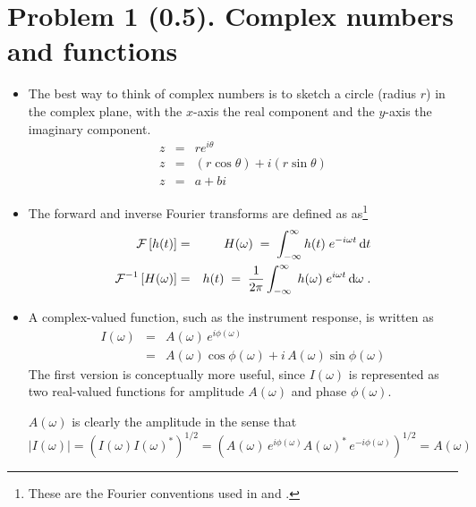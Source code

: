 \documentclass[11pt,titlepage,fleqn]{article}
\newcommand{\fft}{h}
\newcommand{\ffw}{H}
\begin{document}

\pagebreak
\section*{Problem 1 (0.5). Complex numbers and functions}

\begin{itemize}
\item The best way to think of complex numbers is to sketch a circle (radius $r$) in the complex plane, with the $x$-axis the real component and the $y$-axis the imaginary component.
%
\begin{eqnarray*}
z &=& r e^{i\theta}
\\
z &=& (r\cos\theta) + i(r\sin\theta)
\\
z &=& a + bi
\end{eqnarray*}



\item The forward and inverse Fourier transforms are defined as as\footnote{These are the Fourier conventions used in \citet[][p.~109]{DT} and \citet[][Section 6.4.2]{SteinWysession}.}
%
\begin{eqnarray}
\cF \left[ \fft(t) \right] &=& \ffw(\omega)
\;=\; \int_{-\infty}^{\infty} \fft(t) \; e^{-i\omega t} \,\rmd t
\label{fft}
\\
\cF^{-1} \left[ \ffw(\omega) \right] &=& \fft(t) 
\;=\; \frac{1}{2\pi} \int_{-\infty}^{\infty} \; \fft(\omega) \; e^{i\omega t} \,\rmd\omega 
\label{ifft}
\;.
\end{eqnarray}


\item A complex-valued function, such as the instrument response, is written as
%
\begin{eqnarray}
I(\omega) &=& A(\omega)\,e^{i\phi(\omega)}
\\
&=& A(\omega)\cos\phi(\omega) + i\,A(\omega)\sin\phi(\omega)
\end{eqnarray}
%
The first version is conceptually more useful, since $I(\omega)$ is represented as two real-valued functions for amplitude $A(\omega)$ and phase $\phi(\omega)$.

$A(\omega)$ is clearly the amplitude in the sense that
%
\begin{equation}
|I(\omega)| = \left( I(\omega) I(\omega)^* \right)^{1/2}
= \left( A(\omega)\,e^{i\phi(\omega)} A(\omega)^*\,e^{-i\phi(\omega)} \right)^{1/2}
= A(\omega)
\end{equation}

\end{itemize}
\end{document}
